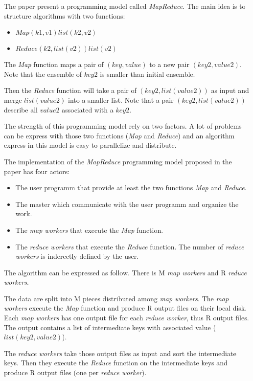\documentclass{article}
\begin{document}
The paper present a programming model called \textit{MapReduce}.
The main idea is to structure algorithms with two functions:
\begin{itemize}
	\item $Map (k1, v1) list(k2,v2)$
	\item $Reduce (k2, list(v2)) list(v2)$
\end{itemize}

The \textit{Map} function maps a pair of $(key,value)$ to a new pair $(key2, value2)$.
Note that the ensemble of $key2$ is smaller than initial ensemble.

Then the \textit{Reduce} function will take a pair of $(key2, list(value2))$ as input and merge $list(value2)$ into a smaller list.
Note that a pair $(key2, list(value2))$ describe all $value2$ associated with a $key2$.

The strength of this programming model rely on two factors.
A lot of problems can be express with those two functions (\textit{Map} and \textit{Reduce}) and an algorithm express in this model is easy to parallelize and distribute.

The implementation of the \textit{MapReduce} programming model proposed in the paper has four actors:
\begin{itemize}
	\item The user programm that provide at least the two functions \textit{Map} and \textit{Reduce}.
	\item The master which communicate with the user programm and organize the work.
	\item The \textit{map workers} that execute the \textit{Map} function.
	\item The \textit{reduce workers} that execute the \textit{Reduce} function. The number of \textit{reduce workers} is inderectly defined by the user.
\end{itemize}

The algorithm can be expressed as follow.
There is M \textit{map workers} and R \textit{reduce workers}.

The data are split into M pieces distributed among \textit{map workers}.
The \textit{map workers} execute the \textit{Map} function and produce R output files on their local disk.
Each \textit{map workers} has one output file for each \textit{reduce worker}, thus R output files.
The output contains a list of intermediate keys with associated value ($list(key2, value2)$).

The \textit{reduce workers} take those output files as input and sort the intermediate keys.
Then they execute the \textit{Reduce} function on the intermediate keys and produce R output files (one per \textit{reduce worker}).
\end{document}
